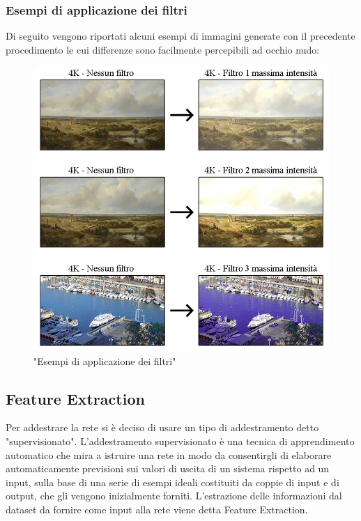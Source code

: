 \documentclass[a4paper,11pt]{article}
\begin{document}
    \subsubsection{Esempi di applicazione dei filtri}
    Di seguito vengono riportati alcuni esempi di immagini generate con il precedente procedimento le cui differenze sono facilmente percepibili ad occhio nudo:
    \begin{figure}[h]
        \centering
        \includegraphics[scale=0.45]{filtri}
        \caption{"Esempi di applicazione dei filtri"}
    \end{figure}


    \newpage
    
    \subsection{Feature Extraction}
    Per addestrare la rete si è deciso di usare un tipo di addestramento detto "supervisionato". 
    L'addestramento supervisionato è una tecnica di apprendimento automatico che mira a istruire una rete in modo da consentirgli di elaborare automaticamente previsioni sui valori di uscita di un sistema rispetto 
    ad un input, sulla base di una serie di esempi ideali costituiti da coppie di input e di output, che gli vengono inizialmente forniti. L'estrazione delle informazioni dal dataset da fornire come input alla rete viene detta Feature Extraction.
    
\end{document}
